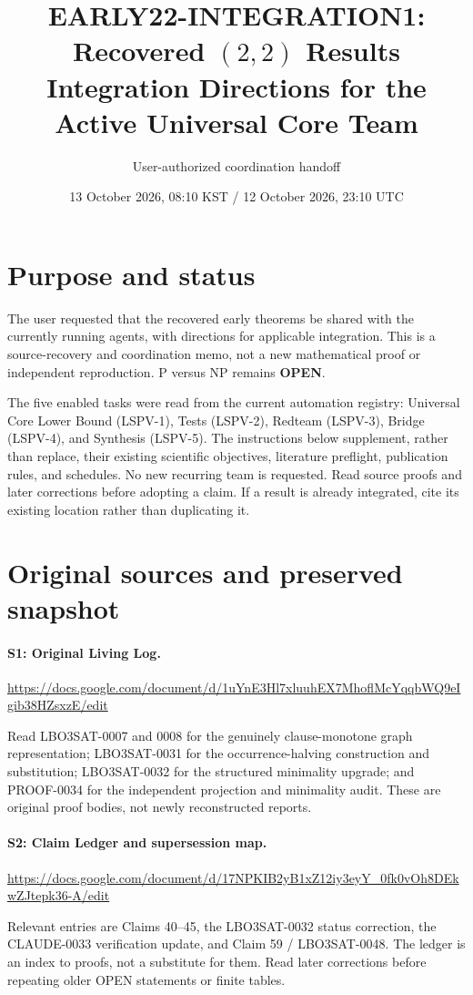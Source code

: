\documentclass[11pt]{article}
\title{EARLY22-INTEGRATION1: Recovered $(2,2)$ Results\\Integration Directions for the Active Universal Core Team}
\author{User-authorized coordination handoff}
\date{13 October 2026, 08:10 KST / 12 October 2026, 23:10 UTC}
\begin{document}
\maketitle

\section{Purpose and status}
The user requested that the recovered early theorems be shared with the currently running agents, with directions for applicable integration. This is a source-recovery and coordination memo, not a new mathematical proof or independent reproduction. P versus NP remains \textbf{OPEN}.

The five enabled tasks were read from the current automation registry: Universal Core Lower Bound (LSPV-1), Tests (LSPV-2), Redteam (LSPV-3), Bridge (LSPV-4), and Synthesis (LSPV-5). The instructions below supplement, rather than replace, their existing scientific objectives, literature preflight, publication rules, and schedules. No new recurring team is requested. Read source proofs and later corrections before adopting a claim. If a result is already integrated, cite its existing location rather than duplicating it.

\section{Original sources and preserved snapshot}
\paragraph{S1: Original Living Log.}
\url{https://docs.google.com/document/d/1uYnE3Hl7xluuhEX7MhoflMcYqqbWQ9eIgib38HZsxzE/edit}

Read LBO3SAT-0007 and 0008 for the genuinely clause-monotone graph representation; LBO3SAT-0031 for the occurrence-halving construction and substitution; LBO3SAT-0032 for the structured minimality upgrade; and PROOF-0034 for the independent projection and minimality audit. These are original proof bodies, not newly reconstructed reports.

\paragraph{S2: Claim Ledger and supersession map.}
\url{https://docs.google.com/document/d/17NPKIB2yB1xZ12iy3eyY_0fk0vOh8DEkwZJtepk36-A/edit}

Relevant entries are Claims 40--45, the LBO3SAT-0032 status correction, the CLAUDE-0033 verification update, and Claim 59 / LBO3SAT-0048. The ledger is an index to proofs, not a substitute for them. Read later corrections before repeating older OPEN statements or finite tables.
\end{document}
